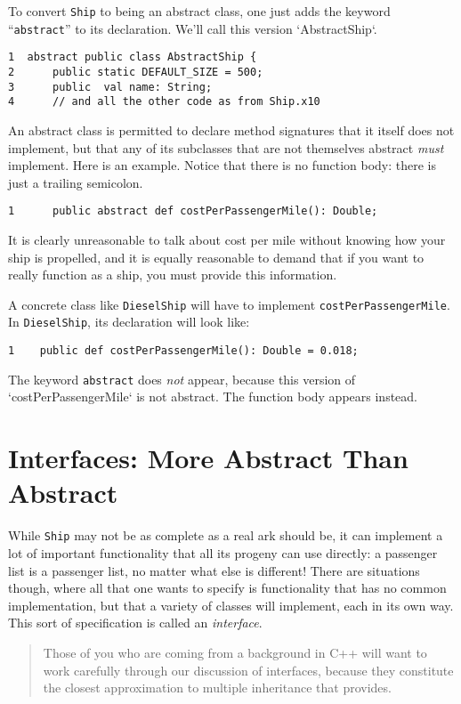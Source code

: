 To convert {\tt Ship} to being an abstract class, one just adds the keyword
``{\tt abstract}'' to its declaration.  We'll call this version
\xcd`AbstractShip`.


\begin{verbatim}
1  abstract public class AbstractShip {
2      public static DEFAULT_SIZE = 500;
3      public  val name: String;
4      // and all the other code as from Ship.x10
\end{verbatim}


An abstract class is permitted to declare method signatures that it itself
does not 
implement, but that any of its subclasses that
are not themselves abstract {\em must} implement.  Here is an example. 
Notice that there is no function body: there is just a trailing semicolon.
\begin{verbatim}
1      public abstract def costPerPassengerMile(): Double;
\end{verbatim}

It is clearly unreasonable to talk about cost per mile without knowing how
your ship is  propelled, and it is equally reasonable to demand that if you
want to really function as a ship, you must provide this information.


A concrete class like {\tt DieselShip}
will have to implement {\tt cost\-Per\-Passen\-ger\-Mile}.
In {\tt DieselShip}, its declaration will
look like:

\begin{verbatim}
1    public def costPerPassengerMile(): Double = 0.018;
\end{verbatim}
The keyword {\tt abstract} does {\em not} appear, because this version of
\xcd`costPerPassengerMile` is not abstract. 
The function body appears instead.

\section{Interfaces: More Abstract Than Abstract}\label{sec:mata}

While {\tt Ship} may not be as complete as a real ark should be, it can implement a
lot of important functionality that all its progeny can use directly: a passenger list is a 
passenger list, no matter what else is different!  There are situations though, where all
that one wants to specify is functionality that has no common implementation, but
that a variety of classes will implement, each in its own way.  This sort of specification
is called an {\em interface}.  
\begin{quote}
Those of you who are coming from a background in C++ will want to work carefully through
our discussion of interfaces, because they constitute the closest approximation
to multiple inheritance that \Xten{} provides.
\end{quote}

